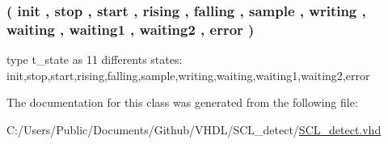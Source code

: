 \subsubsection[{\texorpdfstring{t\+\_\+state}{t_state}}]{ {\bfseries \textcolor{vhdlchar}{(}\textcolor{vhdlchar}{ }\textcolor{vhdlchar}{init}\textcolor{vhdlchar}{ }\textcolor{vhdlchar}{,}\textcolor{vhdlchar}{ }\textcolor{vhdlchar}{stop}\textcolor{vhdlchar}{ }\textcolor{vhdlchar}{,}\textcolor{vhdlchar}{ }\textcolor{vhdlchar}{start}\textcolor{vhdlchar}{ }\textcolor{vhdlchar}{,}\textcolor{vhdlchar}{ }\textcolor{vhdlchar}{rising}\textcolor{vhdlchar}{ }\textcolor{vhdlchar}{,}\textcolor{vhdlchar}{ }\textcolor{vhdlchar}{falling}\textcolor{vhdlchar}{ }\textcolor{vhdlchar}{,}\textcolor{vhdlchar}{ }\textcolor{vhdlchar}{sample}\textcolor{vhdlchar}{ }\textcolor{vhdlchar}{,}\textcolor{vhdlchar}{ }\textcolor{vhdlchar}{writing}\textcolor{vhdlchar}{ }\textcolor{vhdlchar}{,}\textcolor{vhdlchar}{ }\textcolor{vhdlchar}{waiting}\textcolor{vhdlchar}{ }\textcolor{vhdlchar}{,}\textcolor{vhdlchar}{ }\textcolor{vhdlchar}{waiting1}\textcolor{vhdlchar}{ }\textcolor{vhdlchar}{,}\textcolor{vhdlchar}{ }\textcolor{vhdlchar}{waiting2}\textcolor{vhdlchar}{ }\textcolor{vhdlchar}{,}\textcolor{vhdlchar}{ }\textcolor{vhdlchar}{error}\textcolor{vhdlchar}{ }\textcolor{vhdlchar}{)}\textcolor{vhdlchar}{ }} \hspace{0.3cm}{\ttfamily [Type]}}\hypertarget{class_s_c_l__detect_1_1fsm_a5653729522f0b754a9aa9312cc16b167}{}\label{class_s_c_l__detect_1_1fsm_a5653729522f0b754a9aa9312cc16b167}
type t\+\_\+state as 11 differents states\+: init,stop,start,rising,falling,sample,writing,waiting,waiting1,waiting2,error 

The documentation for this class was generated from the following file\+:\begin{DoxyCompactItemize}
\item 
C\+:/\+Users/\+Public/\+Documents/\+Github/\+V\+H\+D\+L/\+S\+C\+L\+\_\+detect/\hyperlink{_s_c_l__detect_8vhd}{S\+C\+L\+\_\+detect.\+vhd}\end{DoxyCompactItemize}
